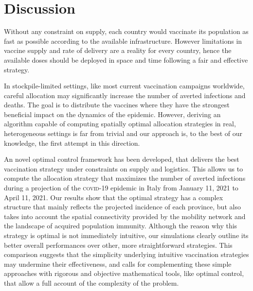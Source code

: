 \section{Discussion}
Without any constraint on supply, each country would vaccinate its population as fast as possible according to the available infrastructure. However limitations in vaccine supply and rate of delivery are a reality for every country, hence the available doses should be deployed in space and time following a fair and effective strategy. 

In stockpile-limited settings, like most current vaccination campaigns worldwide, careful allocation may significantly increase the number of averted infections and deaths. The goal is to distribute the vaccines where they have the strongest beneficial impact on the dynamics of the epidemic. However, deriving an algorithm capable of computing spatially optimal allocation strategies in real, heterogeneous settings is far from trivial and our approach is, to the best of our knowledge, the first attempt in this direction. 

An novel optimal control framework has been developed, that delivers the best vaccination strategy under constraints on supply and logistics. This allows us to compute the allocation strategy that maximizes the number of averted infections during a projection of the \textsc{covid}-19 epidemic in Italy from January 11, 2021 to April 11, 2021. Our results show that the optimal strategy has a complex structure that mainly reflects the projected incidence of each province, but also takes into account the spatial connectivity provided by the mobility network and the landscape of acquired population immunity. Although the reason why this strategy is optimal is not immediately intuitive, our simulations clearly outline its better overall performances over other, more straightforward strategies. This comparison suggests that the simplicity underlying intuitive vaccination strategies may undermine their effectiveness, and calls for complementing these simple approaches with rigorous and objective mathematical tools, like optimal control, that allow a full account of the complexity of the problem.

